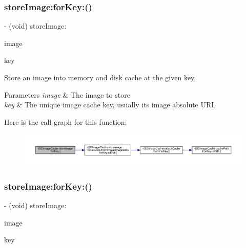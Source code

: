 \subsubsection{\texorpdfstring{store\+Image\+:for\+Key\+:()}{storeImage:forKey:()}\hspace{0.1cm}{\footnotesize\ttfamily [2/3]}}
{\footnotesize\ttfamily -\/ (void) store\+Image\+: \begin{DoxyParamCaption}\item[{(U\+I\+Image $\ast$)}]{image }\item[{forKey:(N\+S\+String $\ast$)}]{key }\end{DoxyParamCaption}}

Store an image into memory and disk cache at the given key.


\begin{DoxyParams}{Parameters}
{\em image} & The image to store \\
\hline
{\em key} & The unique image cache key, usually it\textquotesingle{}s image absolute U\+RL \\
\hline
\end{DoxyParams}
Here is the call graph for this function\+:\nopagebreak
\begin{figure}[H]
\begin{center}
\leavevmode
\includegraphics[width=350pt]{interface_s_d_image_cache_a28d995cab90e214dc5603403a7ed7753_cgraph}
\end{center}
\end{figure}
\mbox{\label{interface_s_d_image_cache_a28d995cab90e214dc5603403a7ed7753}} 
\subsubsection{\texorpdfstring{store\+Image\+:for\+Key\+:()}{storeImage:forKey:()}\hspace{0.1cm}{\footnotesize\ttfamily [3/3]}}
{\footnotesize\ttfamily -\/ (void) store\+Image\+: \begin{DoxyParamCaption}\item[{(U\+I\+Image $\ast$)}]{image }\item[{forKey:(N\+S\+String $\ast$)}]{key }\end{DoxyParamCaption}}

